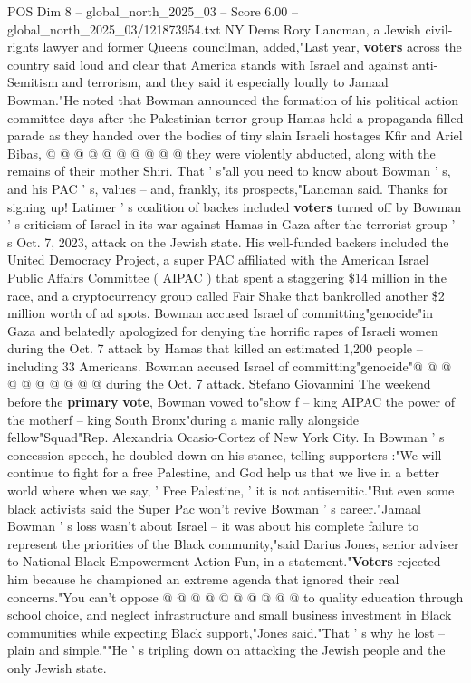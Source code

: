 \begin{textsample}{POS Dim 8 – global\_north\_2025\_03 – Score 6.00 – global\_north\_2025\_03/121873954.txt}
NY Dems Rory Lancman, a Jewish civil-rights lawyer and former Queens councilman, added,"Last year, \textbf{voters} across the country said loud and clear that America stands with Israel and against anti-Semitism and terrorism, and they said it especially loudly to Jamaal Bowman."He noted that Bowman announced the formation of his political action committee days after the Palestinian terror group Hamas held a propaganda-filled parade as they handed over the bodies of tiny slain Israeli hostages Kfir and Ariel Bibas, @ @ @ @ @ @ @ @ @ @ they were violently abducted, along with the remains of their mother Shiri.
That ' s"all you need to know about Bowman ' s, and his PAC ' s, values -- and, frankly, its prospects,"Lancman said.
Thanks for signing up!
Latimer ' s coalition of backes included \textbf{voters} turned off by Bowman ' s criticism of Israel in its war against Hamas in Gaza after the terrorist group ' s Oct. 7, 2023, attack on the Jewish state.
His well-funded backers included the United Democracy Project, a super PAC affiliated with the American Israel Public Affairs Committee ( AIPAC ) that spent a staggering \$14 million in the race, and a cryptocurrency group called Fair Shake that bankrolled another \$2 million worth of ad spots.
Bowman accused Israel of committing"genocide"in Gaza and belatedly apologized for denying the horrific rapes of Israeli women during the Oct. 7 attack by Hamas that killed an estimated 1,200 people -- including 33 Americans.
Bowman accused Israel of committing"genocide"@ @ @ @ @ @ @ @ @ @ during the Oct. 7 attack.
Stefano Giovannini The weekend before the \textbf{primary} \textbf{vote}, Bowman vowed to"show f -- king AIPAC the power of the motherf -- king South Bronx"during a manic rally alongside fellow"Squad"Rep.
Alexandria Ocasio-Cortez of New York City.
In Bowman ' s concession speech, he doubled down on his stance, telling supporters :"We will continue to fight for a free Palestine, and God help us that we live in a better world where when we say, ' Free Palestine, ' it is not antisemitic."But even some black activists said the Super Pac won't revive Bowman ' s career."Jamaal Bowman ' s loss wasn't about Israel -- it was about his complete failure to represent the priorities of the Black community,"said Darius Jones, senior adviser to National Black Empowerment Action Fun, in a statement."\textbf{Voters} rejected him because he championed an extreme agenda that ignored their real concerns."You can't oppose @ @ @ @ @ @ @ @ @ @ to quality education through school choice, and neglect infrastructure and small business investment in Black communities while expecting Black support,"Jones said."That ' s why he lost -- plain and simple.""He ' s tripling down on attacking the Jewish people and the only Jewish state.

\end{textsample}
